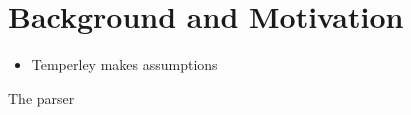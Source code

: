 \section{Background and Motivation}
\label{sec:motivation}

\begin{itemize}
\item Temperley makes assumptions
\end{itemize}

The parser
